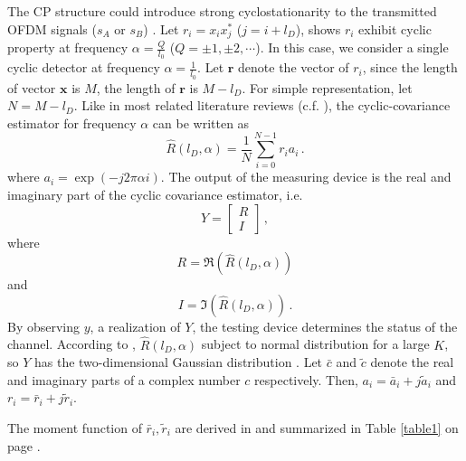 The CP structure could introduce strong cyclostationarity to the transmitted OFDM signals ($s_A$ or $s_B$) \cite{lunden2010robust}. 
Let $r_i=x_ix_j^\ast$ ($j=i+l_D$), \cite{lunden2007spectrum} shows $r_i$ exhibit cyclic property at frequency $\alpha = \frac{Q}{l_0}$ ($Q = \pm1, \pm2, \cdots$). In this case, we consider a single cyclic detector at frequency $\alpha = \frac{1}{l_0}$. 
Let $\mathbf{r}$ denote the vector of $r_i$, since the length of vector $\mathbf{x}$ is $M$, the length of $\mathbf{r}$ is $M - l_D$. For simple representation, let $N = M - l_D$.
Like in most related literature reviews (c.f. \cite{lunden2010robust} \cite{dandawate1994statistical}), the cyclic-covariance estimator for frequency $\alpha$ can be written as
\begin{equation}
  \hat{R}(l_D, \alpha) = \frac{1}{N}\sum_{i=0}^{N-1} r_ia_i\,.
  \label{cyclicR}
\end{equation}
where $a_i = \exp(-j2\pi\alpha i)$. 
The output of the measuring device is the real and imaginary part of the cyclic covariance estimator, i.e. 
\begin{equation}
  Y = \begin{bmatrix}
	R \\
	I
  \end{bmatrix}\,,
  \label{cyclic_cov}
\end{equation}
where 
\[
  R = \Re(\hat{R}(l_D, \alpha))
\]
and 
\[
  I = \Im(\hat{R}(l_D, \alpha))\,.
\]
By observing $y$, a realization  of $Y$, the testing device determines the status of the channel.
According to \cite{lunden2010robust}, $\hat{R}(l_D, \alpha)$ subject to normal distribution for a large $K$, so $Y$ has the two-dimensional Gaussian distribution \cite{goodman1963statistical}.
Let $\bar{c}$ and $\tilde{c}$ denote the real and imaginary parts of a complex number $c$ respectively. Then, $a_i = \bar{a}_i + j\tilde{a}_i$  and $r_i = \bar{r}_i + j\tilde{r}_i$. 

The moment function of $\bar{r}_i, \tilde{r}_i$ are derived in \cite{axell2011optimal} and summarized in Table \ref{table1} on page \pageref{table1}.

